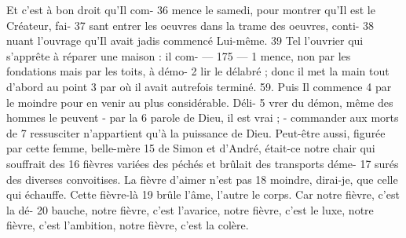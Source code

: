 Et c'est à bon droit qu'Il com-	 
36	 	mence le samedi, pour montrer qu'Il est le Créateur, fai-	 
37	 	sant entrer les oeuvres dans la trame des oeuvres, conti-	 
38	 	nuant l'ouvrage qu'Il avait jadis commencé Lui-même.	 
39	 	Tel l'ouvrier qui s'apprête à réparer une maison : il com-	 
 	--- 175 ---	 
1	 	mence, non par les fondations mais par les toits, à démo-	 
2	 	lir le délabré ; donc il met la main tout d'abord au point	 
3	 	par où il avait autrefois terminé. 59. Puis Il commence	 
4	 	par le moindre pour en venir au plus considérable. Déli-	 
5	 	vrer du démon, même des hommes le peuvent - par la	 
6	 	parole de Dieu, il est vrai ; - commander aux morts de	 
7	 	ressusciter n'appartient qu'à la puissance de Dieu.
Peut-être aussi, figurée par cette femme, belle-mère	 
15	 	de Simon et d'André, était-ce notre chair qui souffrait des	 
16	 	fièvres variées des péchés et brûlait des transports déme-	 
17	 	surés des diverses convoitises. La fièvre d'aimer n'est pas	 
18	 	moindre, dirai-je, que celle qui échauffe. Cette fièvre-là	 
19	 	brûle l'âme, l'autre le corps. Car notre fièvre, c'est la dé-	 
20	 	bauche, notre fièvre, c'est l'avarice, notre fièvre, c'est le luxe, notre fièvre, c'est l'ambition, notre fièvre, c'est la colère.
